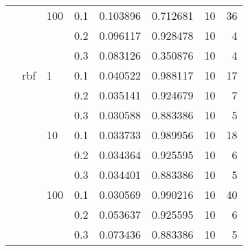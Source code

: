 \begin{table}[H]
\begin{tabular}{llllrrrr}
       &     & 100 & 0.1 &     0.103896 &  0.712681 &        10 &    36 \\
       &     &     & 0.2 &     0.096117 &  0.928478 &        10 &     4 \\
       &     &     & 0.3 &     0.083126 &  0.350876 &        10 &     4 \\
       & rbf & 1   & 0.1 &     0.040522 &  0.988117 &        10 &    17 \\
       &     &     & 0.2 &     0.035141 &  0.924679 &        10 &     7 \\
       &     &     & 0.3 &     0.030588 &  0.883386 &        10 &     5 \\
       &     & 10  & 0.1 &     0.033733 &  0.989956 &        10 &    18 \\
       &     &     & 0.2 &     0.034364 &  0.925595 &        10 &     6 \\
       &     &     & 0.3 &     0.034401 &  0.883386 &        10 &     5 \\
       &     & 100 & 0.1 &     0.030569 &  0.990216 &        10 &    40 \\
       &     &     & 0.2 &     0.053637 &  0.925595 &        10 &     6 \\
       &     &     & 0.3 &     0.073436 &  0.883386 &        10 &     5 \\
\bottomrule
\end{tabular}
\end{table}
